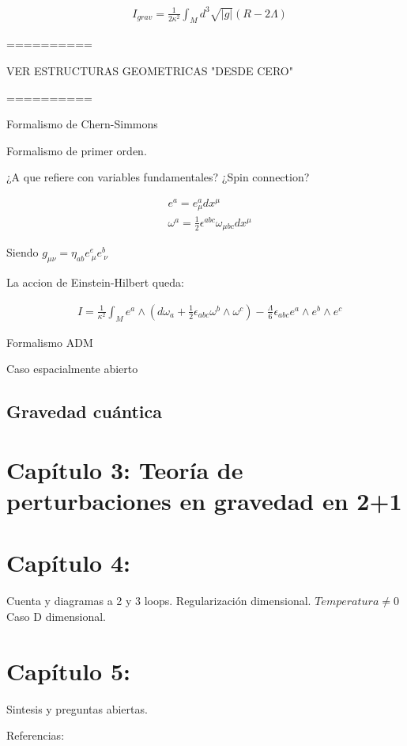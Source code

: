 \documentclass[a4paper, 12pt]{article}
\begin{document}
\begin{align*}
&I_{grav} = \frac{1}{2\kappa^2} \int _M d^3 \sqrt{|g|}(R - 2\Lambda)
\end{align*}

==========

VER ESTRUCTURAS GEOMETRICAS "DESDE CERO"

==========


Formalismo de Chern-Simmons

Formalismo de primer orden.

¿A que refiere con variables fundamentales? ¿Spin connection?

\begin{align*}
&e^a = e^a_\mu dx^\mu\\
&\omega^a = \frac{1}{2}\epsilon^{abc} \omega_{\mu bc} dx^\mu
\end{align*}

Siendo $g_{\mu\nu} = \eta_{ab} e^e_{\ \mu} e^b_{\ \nu}$

La accion de Einstein-Hilbert queda:

\begin{align*}
&I = \frac{1}{\kappa^2} \int_M {e^a \wedge (d\omega_a + \frac{1}{2} \epsilon_{abc} \omega^b \wedge \omega^c) - \frac{\Lambda}{6} \epsilon_{abc} e^a \wedge e^b \wedge e^c}
\end{align*}


\vspace{1cm}

Formalismo ADM

\vspace{1cm}

Caso espacialmente abierto

\vspace{1cm}

\subsection*{Gravedad cuántica}

\vspace{1cm}

\section*{Capítulo 3: Teoría de perturbaciones en gravedad en 2+1}

\vspace{1cm}

\section*{Capítulo 4:}

Cuenta y diagramas a 2 y 3 loops.
Regularización dimensional.
$Temperatura \neq 0$
Caso D dimensional.

\vspace{1cm}

\section*{Capítulo 5:}

Sintesis y preguntas abiertas.


Referencias:
\end{document}
